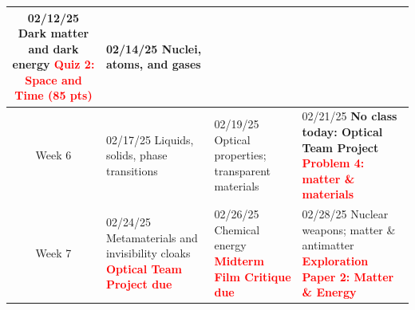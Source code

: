 \documentclass[11pt]{article}
\begin{document}
\begin{tabularx}{\textwidth}{|c|X|X|X|}
    02/12/25 \newline  
    \newline
    Dark matter and dark energy\newline
    \newline
    \textcolor{red}{\textbf{Quiz 2: Space and Time (85 pts)}} &

    02/14/25 \newline
    \newline
    Nuclei, atoms, and gases \\
    
    \hline
    Week 6 & 
    
    02/17/25 \newline
    \newline
    Liquids, solids, phase transitions \newline\newline
    &
    
    02/19/25 \newline  
    \newline
    Optical properties; transparent materials    
    &

    \cellcolor{gray!20}02/21/25 \newline
    \newline
    \textbf{No class today: Optical Team Project} \newline\newline
    \textcolor{red}{\textbf{Problem 4: matter \& materials}} \\

    \hline
    Week 7 & 
    
    02/24/25 \newline
    \newline
    Metamaterials and invisibility cloaks \newline\newline
    \textcolor{red}{\textbf{Optical Team Project due}}&
    
    02/26/25 \newline  
    \newline
    Chemical energy\newline\newline   
    \textcolor{red}{\textbf{Midterm Film Critique due}}&

    02/28/25 \newline
    \newline
    Nuclear weapons; matter \& antimatter \newline\newline
    \textcolor{red}{\textbf{Exploration Paper 2: Matter \& Energy}} \\
    \hline
\end{tabularx}
 
\end{document}
